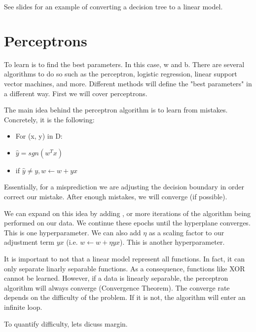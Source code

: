 See slides for an example of converting a decision tree to a linear model.

\section{Perceptrons}
To learn is to find the best parameters. In this case, w and b. There are several algorithms to do so such as the perceptron, logistic regression, linear support vector machines, and more. Different methods will define the "best parameters" in a different way. First we will cover perceptrons. 

The main idea behind the perceptron algorithm is to learn from mistakes. Concretely, it is the following:
\begin{itemize}
    \item For (x, y) in D:
    \item $\hat{y} = sgn(w^Tx)$
    \item if $\hat{y} \neq y, w \leftarrow w + yx$
\end{itemize}

Essentially, for a misprediction we are adjusting the decision boundary in order correct our mistake. After enough mistakes, we will converge (if possible).

We can expand on this idea by adding , or more iterations of the algorithm being performed on our data. We continue these epochs until the hyperplane converges. This is one hyperparameter. We can also add $\eta$ as a scaling factor to our adjustment term $yx$ (i.e. $w \leftarrow w + \eta yx$). This is another hyperparameter.

It is important to not that a linear model  represent all functions. In fact, it can only separate linarly separable functions. As a consequence, functions like XOR cannot be learned. However, if a data is linearly separable, the perceptron algorithm will always converge (Convergence Theorem). The converge rate depends on the difficulty of the problem. If it is not, the algorithm will enter an infinite loop.

To quantify difficulty, lets dicuss margin.

